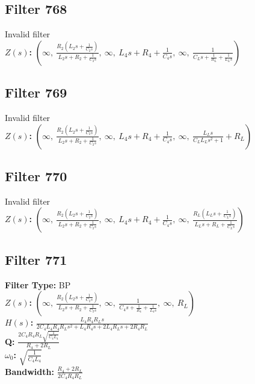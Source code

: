 \documentclass{article}
\begin{document}
\subsection*{Filter 768}
Invalid filter \\ 
\textbf{$Z(s)$:} $\left( \infty, \  \frac{R_{2} \left(L_{2} s + \frac{1}{C_{2} s}\right)}{L_{2} s + R_{2} + \frac{1}{C_{2} s}}, \  \infty, \  L_{4} s + R_{4} + \frac{1}{C_{4} s}, \  \infty, \  \frac{1}{C_{L} s + \frac{1}{R_{L}} + \frac{1}{L_{L} s}}\right)$ \\ 
\subsection*{Filter 769}
Invalid filter \\ 
\textbf{$Z(s)$:} $\left( \infty, \  \frac{R_{2} \left(L_{2} s + \frac{1}{C_{2} s}\right)}{L_{2} s + R_{2} + \frac{1}{C_{2} s}}, \  \infty, \  L_{4} s + R_{4} + \frac{1}{C_{4} s}, \  \infty, \  \frac{L_{L} s}{C_{L} L_{L} s^{2} + 1} + R_{L}\right)$ \\ 
\subsection*{Filter 770}
Invalid filter \\ 
\textbf{$Z(s)$:} $\left( \infty, \  \frac{R_{2} \left(L_{2} s + \frac{1}{C_{2} s}\right)}{L_{2} s + R_{2} + \frac{1}{C_{2} s}}, \  \infty, \  L_{4} s + R_{4} + \frac{1}{C_{4} s}, \  \infty, \  \frac{R_{L} \left(L_{L} s + \frac{1}{C_{L} s}\right)}{L_{L} s + R_{L} + \frac{1}{C_{L} s}}\right)$ \\ 
\subsection*{Filter 771}
\textbf{Filter Type:} BP \\ 
\textbf{$Z(s)$:} $\left( \infty, \  \frac{R_{2} \left(L_{2} s + \frac{1}{C_{2} s}\right)}{L_{2} s + R_{2} + \frac{1}{C_{2} s}}, \  \infty, \  \frac{1}{C_{4} s + \frac{1}{R_{4}} + \frac{1}{L_{4} s}}, \  \infty, \  R_{L}\right)$ \\ 
\textbf{$H(s)$:} $\frac{L_{4} R_{4} R_{L} s}{2 C_{4} L_{4} R_{4} R_{L} s^{2} + L_{4} R_{4} s + 2 L_{4} R_{L} s + 2 R_{4} R_{L}}$ \\ 
\textbf{Q:} $\frac{2 C_{4} R_{4} R_{L} \sqrt{\frac{1}{C_{4} L_{4}}}}{R_{4} + 2 R_{L}}$ \\ 
\textbf{$\omega_0$:} $\sqrt{\frac{1}{C_{4} L_{4}}}$ \\ 
\textbf{Bandwidth:} $\frac{R_{4} + 2 R_{L}}{2 C_{4} R_{4} R_{L}}$ \\ 
\end{document}
